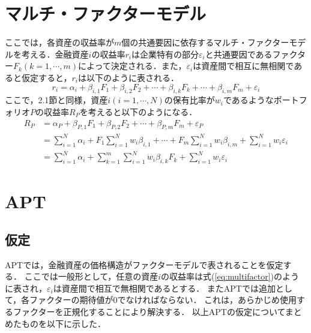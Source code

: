 ﻿\documentclass[11pt]{jreport}
\begin{document}
\section{マルチ・ファクターモデル}
ここでは，各資産の収益率が$m$個の共通要因に依存するマルチ・ファクターモデルを考える．金融資産$i$の収益率$r_i$は企業特有の部分$\varepsilon_i$と共通要因であるファクター$F_k(k=1,\cdots,m)$によって決定される．また，$\varepsilon_i$は資産間で相互に無相関であると仮定すると，$r_i$は以下のように表される．
\begin{equation}
r_i = \alpha_i + \beta_{i,1}F_1 + \beta_{i,2}F_2 + \cdots + \beta_{i,k}F_k + \cdots + \beta_{i,m}F_m + \varepsilon_i
\label{eq:multifactor}
\end{equation}
ここで，2.1節と同様，資産$i(i=1,\cdots,N)$の保有比率が$w_i$であるようなポートフォリオ$P$の収益率$R_P$を考えると以下のようになる．
\begin{equation}
\begin{split}
R_P &= \alpha_P + \beta_{P,1} F_1 + \beta_{P,2} F_2 + \cdots + \beta_{P,m} F_m + \varepsilon_P\\
&=\sum_{i=1}^N \alpha_i + F_1 \sum_{i=1}^N w_i \beta_{i,1} + \cdots + F_m \sum_{i=1}^N w_i \beta_{i,m} + \sum_{i=1}^N w_i\varepsilon_i\\
&= \sum_{i=1}^N \alpha_i + \sum_{k=1}^m \sum_{i=1}^N w_i \beta_{i,k} F_k + \sum_{i=1}^N w_i\varepsilon_i
\label{eq:multi}
\end{split}
\end{equation}


\section{APT}

\subsection{仮定}
APTでは，金融資産の価格構造がファクターモデルで表されることを仮定する．
ここでは一般形として，任意の資産$i$の収益率は式(\ref{eq:multifactor})のように表され，$\varepsilon_i$は資産間で相互で無相関であるとする．
またAPTでは追加として，各ファクターの期待値が0でなければならない．
これは，あらかじめ使用するファクターを正規化することにより解決する．
以上APTの仮定についてまとめたものを以下に示した．
\end{document}

